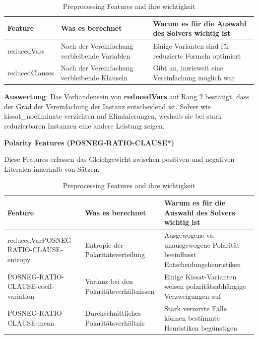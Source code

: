 \begin{table}[H]
    \centering
    \begin{tabular}{p{}p{}p{}}
        \textbf{Feature} & \textbf{Was es berechnet} & \textbf{Warum es für die Auswahl des Solvers wichtig ist} \\
        \toprule
        reducedVars & Nach der Vereinfachung verbleibende Variablen & Einige Varianten sind für reduzierte Formeln optimiert \\
        \midrule
        reducedClauses & Nach der Vereinfachung verbleibende Klauseln & Gibt an, inwieweit eine Vereinfachung möglich war \\
        \bottomrule
    \end{tabular}
    \caption{Preprocessing Features and ihre wichtigkeit}\label{tab:preprocessing_features}
\end{table}

\textbf{Auswertung}: Das Vorhandensein von \textbf{reducedVars} auf Rang 2 bestätigt, dass der Grad der 
Vereinfachung der Instanz entscheidend ist. Solver wie kissat\_noeliminate verzichten auf Eliminierungen, weshalb 
sie bei stark reduzierbaren Instanzen eine andere Leistung zeigen.

\textbf{Polarity Features (POSNEG-RATIO-CLAUSE*)}

Diese Features erfassen das Gleichgewicht zwischen positiven und negativen Literalen innerhalb von Sätzen.

\begin{table}[H]
    \centering
    \begin{tabular}{p{}p{}p{}}
        \textbf{Feature} & \textbf{Was es berechnet} & \textbf{Warum es für die Auswahl des Solvers wichtig ist} \\
        \toprule
        reducedVarPOSNEG-RATIO-CLAUSE-entropy & Entropie der Polaritätsverteilung & Ausgewogene vs. unausgewogene Polarität beeinflusst Entscheidungsheuristiken \\
        \midrule
        POSNEG-RATIO-CLAUSE-coeff-variation & Varianz bei den Polaritätsverhältnissen & Einige Kissat-Varianten weisen polaritätsabhängige Verzweigungen auf \\
        \midrule
        POSNEG-RATIO-CLAUSE-mean & Durchschnittliches Polaritätsverhältnis & Stark verzerrte Fälle können bestimmte Heuristiken begünstigen \\
        \bottomrule
    \end{tabular}
    \caption{Preprocessing Features and ihre wichtigkeit}\label{tab:polarity_features}
\end{table}

